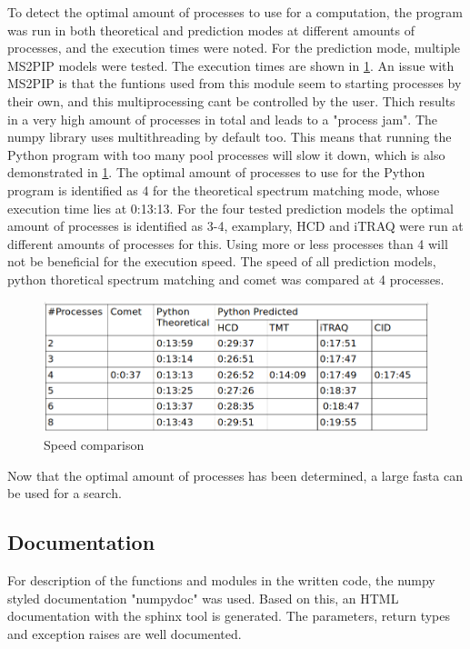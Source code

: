 \documentclass[11pt]{article}
\begin{document}
To detect the optimal amount of processes to use for a computation, the program was run in both theoretical and prediction modes at different amounts of processes, and the execution times were noted. For the prediction mode, multiple MS2PIP models were tested. The execution times are shown in \cref{fig:speed-comparison}. An issue with MS2PIP is that the funtions used from this module seem to starting processes by their own, and this multiprocessing cant be controlled by the user. Thich results in a very high amount of processes in total and leads to a "process jam". The numpy library uses multithreading by default too. This means that running the Python program with too many pool processes will slow it down, which is also demonstrated in \cref{fig:speed-comparison}. The optimal amount of processes to use for the Python program is identified as 4 for the theoretical spectrum matching mode, whose execution time lies at 0:13:13. For the four tested prediction models the optimal amount of processes is identified as 3-4, examplary, HCD and iTRAQ were run at different amounts of processes for this. Using more or less processes than 4 will not be beneficial for the execution speed. The speed of all prediction models, python thoretical spectrum matching and comet was compared at 4 processes.

\begin{figure}[ht]
\centering
\includegraphics[width=1\textwidth]{figs/speed-comparison.png}
\caption{Speed comparison}
\label{fig:speed-comparison}
\end{figure}

Now that the optimal amount of processes has been determined, a large fasta can be used for a search.

\subsection{Documentation}
For description of the functions and modules in the written code, the numpy styled documentation "numpydoc" was used. Based on this, an HTML documentation with the sphinx tool is generated. The parameters, return types and exception raises are well documented.
\end{document}
